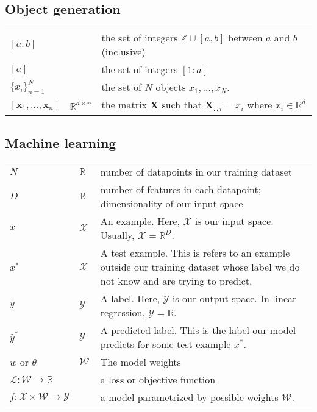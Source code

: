 \subsection*{Object generation}
\begin{tabular}{p{0.13\linewidth}p{0.07\linewidth}p{0.80\linewidth}}
  $[a:b]$                                &                           & the set of integers $\mathbb Z \cup [a, b]$ between $a$ and $b$ (inclusive) \\
  $[a]$                                  &                           & the set of integers $[1:a]$ \\
  $\{x_i\}_{n=1}^{N}$                    &                           & the set of $N$ objects $x_1, \dots, x_N$. \\
  $[\bm{x}_1, \ldots, \bm{x}_n]$ & $\mathbb{R}^{d \times n}$ & the matrix $\bm{X}$ such that $\bm{X}_{:,i} = x_i$ where $x_i \in \mathbb{R}^d$ \\
\end{tabular}

\subsection*{Machine learning}
\begin{tabular}{p{0.13\linewidth}p{0.07\linewidth}p{0.80\linewidth}}
  $N$ & $\mathbb R$ & number of datapoints in our training dataset \\
  $D$ & $\mathbb R$ & number of features in each datapoint; dimensionality of our input space \\
  $x$ & $\mathcal X$ & An example. Here, $\mathcal X$ is our input space. Usually, $\mathcal X = \mathbb R^D$. \\
  $x^*$ & $\mathcal X$ & A test example. This is refers to an example outside our training dataset whose label we do not know and are trying to predict. \\
  $y$ & $\mathcal Y$ & A label. Here, $\mathcal Y$ is our output space. In linear regression, $\mathcal Y = \mathbb R$. \\
  $\hat y^*$ &  $\mathcal Y$ & A predicted label. This is the label our model predicts for some test example $x^*$. \\
  $w$ or $\theta$ & $\mathcal W$ & The model weights \\
  $\mathcal L : \mathcal W \to \mathbb R$ & & a loss or objective function \\
  \mbox{$f : \mathcal X \times \mathcal W \to \mathcal Y$} & & a model parametrized by possible weights $\mathcal W$. \\
\end{tabular}

